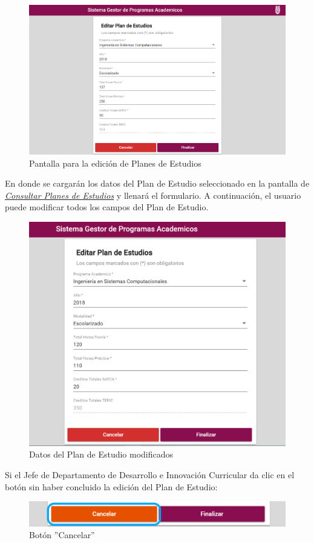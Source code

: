 \begin{figure}[!hbtp]
	\centering
	\hypertarget{editarPE}{\includegraphics[width=0.7\linewidth]{images/SP4-GPE/editarPE}}
	\caption{Pantalla para la edición de Planes de Estudios}
	\label{editarPE}
\end{figure}

En donde se cargarán los datos del Plan de Estudio seleccionado en la pantalla de \hyperlink{consultarPE}{\textit{Consultar Planes de Estudios}} y llenará el formulario.
\newpage
A continuación, el usuario puede modificar todos los campos del Plan de Estudio.
\begin{figure}[!hbtp]
	\centering
	\hypertarget{modif}{\includegraphics[width=0.7\linewidth]{images/SP4-GPE/editarPE1}}
	\caption{Datos del Plan de Estudio modificados}
	\label{modif}
\end{figure}

 Si el Jefe de Departamento de Desarrollo e Innovación Curricular da clic en el botón  sin haber concluido la edición del Plan de Estudio:

\begin{figure}[!hbtp]
	\centering
	\hypertarget{cancel2}{\includegraphics[width=0.7\linewidth]{images/SP4-GPE/cancelarPE}}
	\caption{Botón ''Cancelar''}
	\label{cancel2}
\end{figure}
\newpage

